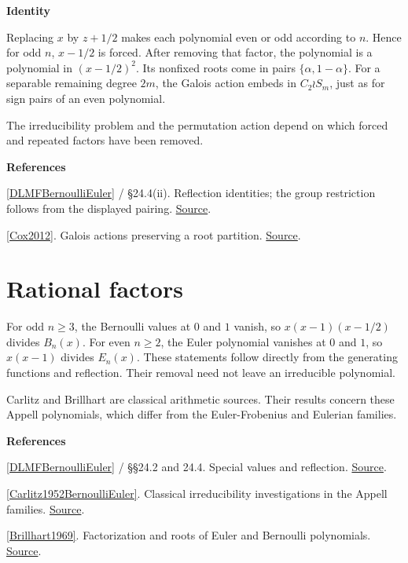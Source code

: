\documentclass[11pt,a4paper,oneside,openany]{book}
\newcommand{\atlasdisplay}[1]{\par\begingroup\centering\vspace{3pt}\noindent\adjustbox{max width=\linewidth}{\(\displaystyle #1\)}\par\vspace{5pt}\endgroup}
\newenvironment{sources}{\par\smallskip\begingroup\footnotesize\color{atlasgray}\leftskip=10pt\setlength{\parskip}{2pt}}{\par\endgroup\smallskip}
\begin{document}
\begin{atlasblock}[standard]
\textbf{\sffamily Identity}\par\smallskip

\atlasdisplay{B_n(1-x)=(-1)^nB_n(x),\qquad E_n(1-x)=(-1)^nE_n(x).}
\end{atlasblock}\color{black}
\color{black} Replacing \(x\) by \(z+1/2\) makes each polynomial even or odd according to \(n\). Hence for odd \(n\), \(x-1/2\) is forced. After removing that factor, the polynomial is a polynomial in \((x-1/2)^2\). Its nonfixed roots come in pairs \(\{\alpha,1-\alpha\}\). For a separable remaining degree \(2m\), the Galois action embeds in \(C_2\wr S_m\), just as for sign pairs of an even polynomial.\par
\color{black} The irreducibility problem and the permutation action depend on which forced and repeated factors have been removed.\par
\begin{sources}
\textbf{References}\par\smallskip
\noindent\hyperlink{ref:DLMFBernoulliEuler}{[DLMFBernoulliEuler]} / §24.4(ii). Reflection identities; the group restriction follows from the displayed pairing. \href{https://dlmf.nist.gov/24}{Source}.\par
\noindent\hyperlink{ref:Cox2012}{[Cox2012]}. Galois actions preserving a root partition. \href{https://onlinelibrary.wiley.com/doi/book/10.1002/9781118218457}{Source}.\par
\end{sources}\color{black}
\section{Rational factors}
\color{black} For odd \(n\ge3\), the Bernoulli values at \(0\) and \(1\) vanish, so \(x(x-1)(x-1/2)\) divides \(B_n(x)\). For even \(n\ge2\), the Euler polynomial vanishes at \(0\) and \(1\), so \(x(x-1)\) divides \(E_n(x)\). These statements follow directly from the generating functions and reflection. Their removal need not leave an irreducible polynomial.\par
\color{black} Carlitz and Brillhart are classical arithmetic sources. Their results concern these Appell polynomials, which differ from the Euler-Frobenius and Eulerian families.\par
\begin{sources}
\textbf{References}\par\smallskip
\noindent\hyperlink{ref:DLMFBernoulliEuler}{[DLMFBernoulliEuler]} / §§24.2 and 24.4. Special values and reflection. \href{https://dlmf.nist.gov/24}{Source}.\par
\noindent\hyperlink{ref:Carlitz1952BernoulliEuler}{[Carlitz1952BernoulliEuler]}. Classical irreducibility investigations in the Appell families. \href{https://doi.org/10.1215/S0012-7094-52-01948-0}{Source}.\par
\noindent\hyperlink{ref:Brillhart1969}{[Brillhart1969]}. Factorization and roots of Euler and Bernoulli polynomials. \href{https://doi.org/10.1515/crll.1969.234.45}{Source}.\par
\end{sources}\color{black}
\end{document}

